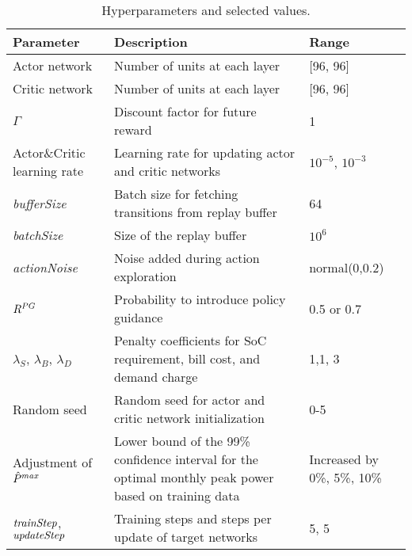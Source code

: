 \begin{table}[hpt]
\centering
\small
\caption{Hyperparameters and selected values.}
\begin{tabular}{|>{\raggedright}p{1.7cm}|p{4cm}|p{1.3cm}|}
\hline
Parameter & Description & Range \\ 
\hline
Actor network & Number of units at each layer & [96, 96] \\\hline
Critic network & Number of units at each layer & [96, 96] \\\hline
$\Gamma$ & Discount factor for future reward & 1 \\\hline 
Actor\&Critic learning rate &Learning rate for updating actor and critic networks & $10^{-5}$, $10^{-3}$ \\\hline 
{\it bufferSize} & Batch size for fetching transitions from replay buffer & 64 \\\hline 
{\it batchSize} & Size of the replay buffer & $10^6$ \\\hline 
{\it actionNoise} & Noise added during action exploration & normal(0,0.2)\\\hline 
${R^{PG}}$ & Probability to introduce policy guidance & 0.5 or 0.7 \\\hline  
$\lambda_{S}$, $\lambda_{B}$, $\lambda_{D}$ & Penalty coefficients for SoC requirement, bill cost, and demand charge &1,1, 3\\\hline 
Random seed & Random seed for actor and critic network initialization  &0-5\\\hline  
Adjustment of $\hat{P}^{max}$& Lower bound of the 99\% confidence interval for the optimal monthly peak power based on training data & Increased by 0\%, 5\%, 10\% \\\hline  
${\it trainStep}$, ${\it updateStep}$& Training steps and steps per update of target networks& 5, 5\\\hline  


\end{tabular}
\label{tab:hyperparameters}
\end{table} 
